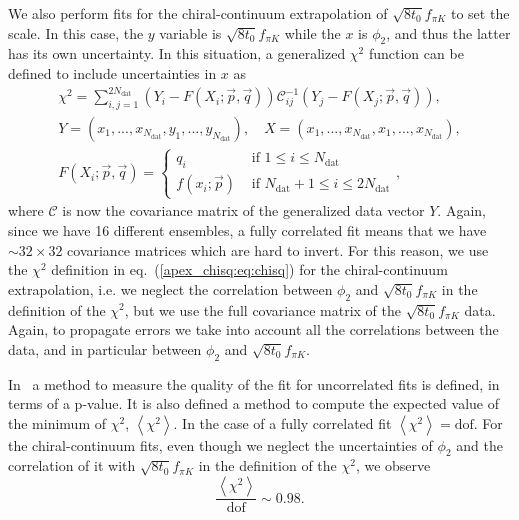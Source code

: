 We also perform fits for the chiral-continuum extrapolation of $\sqrt{8t_0}f_{\pi K}$ to set the scale. In this case, the $y$ variable is $\sqrt{8t_0}f_{\pi K}$ while the $x$ is $\phi_2$, and thus the latter has its own uncertainty. In this situation, a generalized $\chi^2$ function can be defined to include uncertainties in $x$ as
\begin{gather}
\label{apex_chisq:eq:chisq_generalized}
\chi^2=\sum_{i,j=1}^{2N_{\textrm{dat}}}\left(Y_i-F(X_i;\vec{p},\vec{q})\right)\mathcal{C}_{ij}^{-1}\left(Y_j-F(X_j;\vec{p},\vec{q})\right), \\
Y=(x_1,...,x_{N_{\textrm{dat}}},y_1,...,y_{N_{\textrm{dat}}}), \quad
X=(x_1,...,x_{N_{\textrm{dat}}},x_1,...,x_{N_{\textrm{dat}}}), \\
F(X_i;\vec{p},\vec{q})=\left\{\begin{matrix}
q_i & \textrm{ if $1\leq i\leq N_{\textrm{dat}}$} \\ 
f(x_i;\vec{p}) & \textrm{ if $N_{\textrm{dat}}+1\leq i\leq 2N_{\textrm{dat}}$}
\end{matrix}\right.,
\end{gather}
where $\mathcal{C}$ is now the covariance matrix of the generalized data vector $Y$. Again, since we have 16 different ensembles, a fully correlated fit means that we have $\sim32\times32$ covariance matrices which are hard to invert. For this reason, we use the $\chi^2$ definition in eq.~(\ref{apex_chisq:eq:chisq}) for the chiral-continuum extrapolation, i.e. we neglect the correlation between $\phi_2$ and $\sqrt{8t_0}f_{\pi K}$ in the definition of the $\chi^2$, but we use the full covariance matrix of the $\sqrt{8t_0}f_{\pi K}$ data. Again, to propagate errors we take into account all the correlations between the data, and in particular between $\phi_2$ and $\sqrt{8t_0}f_{\pi K}$.

In~\citep{Bruno:2022mfy} a method to measure the quality of the fit for uncorrelated fits is defined, in terms of a p-value. It is also defined a method to compute the expected value of the minimum of $\chi^2$, $\left<\chi^2\right>$. In the case of a fully correlated fit $\left<\chi^2\right>={\textrm{dof}}$. For the chiral-continuum fits, even though we neglect the uncertainties of $\phi_2$ and the correlation of it with $\sqrt{8t_0}f_{\pi K}$ in the definition of the $\chi^2$, we observe
\begin{equation}
\frac{\left<\chi^2\right>}{{\textrm{dof}}}\sim0.98.
\end{equation}


